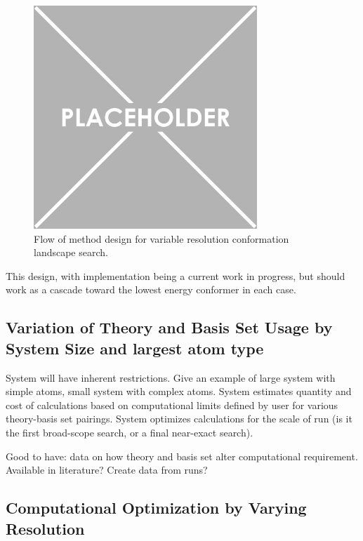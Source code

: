 \begin{figure}
	
	\centering
	
	\includegraphics[width=0.75\textwidth]{placeholder.png}
	
	\caption{Flow of method design for variable resolution conformation landscape search.}
	
	\label{fig:VRSDesign}
	
\end{figure}

This design, with implementation being a current work in progress, but should{\texttrademark} work as a cascade toward the lowest energy conformer in each case.

\subsection{Variation of Theory and Basis Set Usage by System Size and largest atom type}

System will have inherent restrictions. Give an example of large system with simple atoms, small system with complex atoms.
System estimates quantity and cost of calculations based on computational limits defined by user for various theory-basis set pairings. 
System optimizes calculations for the scale of run (is it the first broad-scope search, or a final near-exact search).

Good to have: data on how theory and basis set alter computational requirement. Available in literature? Create data from runs?

\subsection{Computational Optimization by Varying Resolution}

